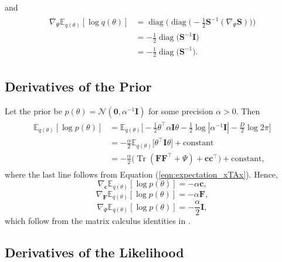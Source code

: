 \documentclass[msc,deptreport.inf]{infthesis} %
\newcommand{\matr}[1]{\mathbf{#1}}
\newcommand{\E}{\mathbb E}
\newcommand{\diag}{\mathop{\mathrm{diag}}}
\newcommand{\tr}{\mathop{\mathrm{Tr}}}
\begin{document}
and
\begin{align}
\begin{split}\label{eqn:grad_vi_dist_wrt_Psi}
	\nabla_\Psi \E_{q(\theta)} [\log q(\theta)]
	& = \diag\Big(\diag\Big(-\frac{1}{2} \matr{S}^{-1} (\nabla_\Psi \matr{S}) \Big)\Big) \\
	& = -\frac{1}{2} \diag\big(\matr{S}^{-1} \matr{I}\big) \\
	& = -\frac{1}{2} \diag\big(\matr{S}^{-1}\big).
\end{split}
\end{align}

\subsection{Derivatives of the Prior}

Let the prior be $p(\theta) = \mathcal{N}(\matr{0}, \alpha^{-1} \matr{I})$ for some precision $\alpha > 0$. Then
\begin{align}
\begin{split}
	\E_{q(\theta)} [\log p(\theta)]
	& = \E_{q(\theta)} \Big[-\frac{1}{2} \theta^\intercal \alpha \matr{I} \theta  - \frac{1}{2} \log |\alpha^{-1} \matr{I}| - \frac{D}{2} \log 2\pi\Big] \\
	& = -\frac{\alpha}{2} \E_{q(\theta)} \Big[ \theta^\intercal \matr{I} \theta \Big] + \text{constant} \\
	& = -\frac{\alpha}{2}\big( \tr(\matr{FF}^{\intercal} + \Psi) + \matr{c}\matr{c}^\intercal \big)+ \text{constant},
\end{split}
\end{align}
where the last line follows from Equation (\ref{eqn:expectation_xTAx}). Hence, 
\begin{equation}
	\nabla_\matr{c} \E_{q(\theta)} [\log p(\theta)] = -\alpha \matr{c},
\end{equation}
\begin{equation}
	\nabla_\matr{F} \E_{q(\theta)} [\log p(\theta)] = -\alpha \matr{F},
\end{equation}
\begin{equation}\label{eqn:grad_prior_wrt_psi}
	\nabla_\Psi \E_{q(\theta)} [\log p(\theta)] = -\frac{\alpha}{2} \matr{I},
\end{equation}
which follow from the matrix calculus identities in \cite{petersen2012}.

\subsection{Derivatives of the Likelihood}
\end{document}
